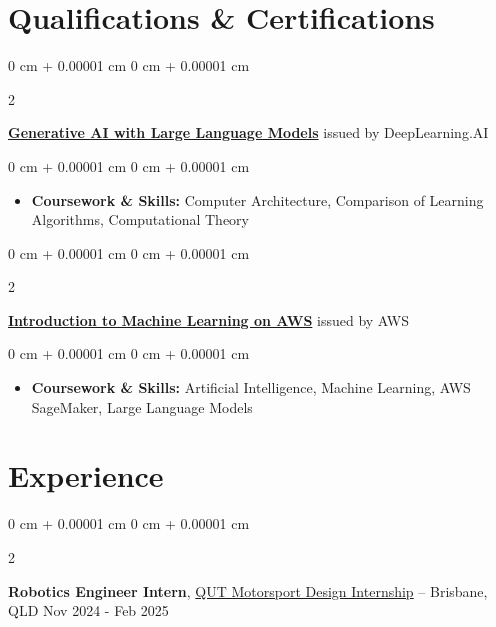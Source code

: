 \documentclass[10pt, letterpaper]{article}
\newenvironment{highlights}{
    \begin{itemize}[
        topsep=0.10 cm,
        parsep=0.10 cm,
        partopsep=0pt,
        itemsep=0pt,
        leftmargin=0 cm + 10pt
    ]
}{
    \end{itemize}
} %
\newenvironment{onecolentry}{
    \begin{adjustwidth}{
        0 cm + 0.00001 cm
    }{
        0 cm + 0.00001 cm
    }
}{
    \end{adjustwidth}
} %
\newenvironment{twocolentry}[2][]{
    \onecolentry
    \def\secondColumn{#2}
    \setcolumnwidth{\fill, 4.5 cm}
    \begin{paracol}{2}
}{
    \switchcolumn \raggedleft \secondColumn
    \end{paracol}
    \endonecolentry
} %
\begin{document}
\section{Qualifications \& Certifications}

\begin{twocolentry}{
            issued by DeepLearning.AI
      }
      \textbf{\href{https://www.coursera.org/account/accomplishments/verify/GS66RVWG9TQ8}{Generative AI with Large Language Models}}\end{twocolentry}

\vspace{0.10 cm}
\begin{onecolentry}
      \begin{highlights}

            \item \textbf{Coursework \& Skills:} Computer Architecture, Comparison of Learning Algorithms, Computational Theory

      \end{highlights}
\end{onecolentry}

\vspace{0.2 cm}

\begin{twocolentry}{
            issued by AWS
      }
      \textbf{\href{https://www.coursera.org/account/accomplishments/verify/6ELNTS6QUBYK}{Introduction to Machine Learning on AWS}}\end{twocolentry}

\vspace{0.10 cm}
\begin{onecolentry}
      \begin{highlights}

            \item \textbf{Coursework \& Skills:} Artificial Intelligence, Machine Learning, AWS SageMaker, Large Language Models

      \end{highlights}
\end{onecolentry}

\section{Experience}

\begin{twocolentry}{
            Nov 2024 - Feb 2025
      }
      \textbf{Robotics Engineer Intern}, \href{https://qutmotorsport.com/}{QUT Motorsport Design Internship} -- Brisbane, QLD\end{twocolentry}
\end{document}
